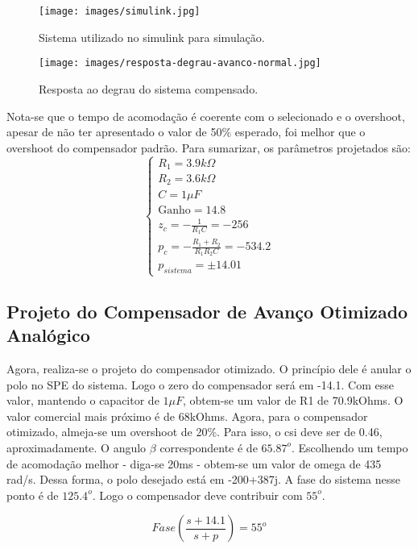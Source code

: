 \begin{figure}[H]
\centering
\texttt{[image: images/simulink.jpg]}
\caption{Sistema utilizado no simulink para simulação.}
\label{fig:simulink}
\end{figure}

\begin{figure}[H]
\centering
\texttt{[image: images/resposta-degrau-avanco-normal.jpg]}
\caption{Resposta ao degrau do sistema compensado.}
\label{fig:avanco-normal}
\end{figure}

Nota-se que o tempo de acomodação é coerente com o selecionado e o overshoot, apesar de não ter apresentado o valor de 50\% esperado, foi melhor que o overshoot do compensador padrão. Para sumarizar, os parâmetros projetados são:
\begin{equation}
    \left\{ \begin{array}{l}
     R_1 = 3.9k \Omega  \\
     R_2 = 3.6k \Omega  \\
     C = 1 \mu F \\ 
     \mbox{Ganho} = 14.8 \\
     z_{c} = -\frac{1}{R_1C} = -256 \\
     p_{c} = -\frac{R_1 + R_2}{R_1R_2C} = -534.2\\
     p_{sistema} = \pm 14.01
    \end{array}\right.
\end{equation}


\subsection{Projeto do Compensador de Avanço Otimizado Analógico}
Agora, realiza-se o projeto do compensador otimizado. O princípio dele é anular o polo no SPE do sistema. Logo o zero do compensador será em -14.1. Com esse valor, mantendo o capacitor de $1\mu F$, obtem-se um valor de R1 de 70.9kOhms. O valor comercial mais próximo é de 68kOhms. Agora, para o compensador otimizado, almeja-se um overshoot de 20\%. Para isso, o csi deve ser de 0.46, aproximadamente. O angulo $\beta$ correspondente é de $65.87^o$. Escolhendo um tempo de acomodação melhor - diga-se 20ms - obtem-se um valor de omega de 435 rad/s. Dessa forma, o polo desejado está em -200+387j. A fase do sistema nesse ponto é de $125.4^o$. Logo o compensador deve contribuir com $55^o$. 

\begin{equation}
Fase\left( \frac{s+14.1}{s+p} \right)=55^o
\end{equation}


